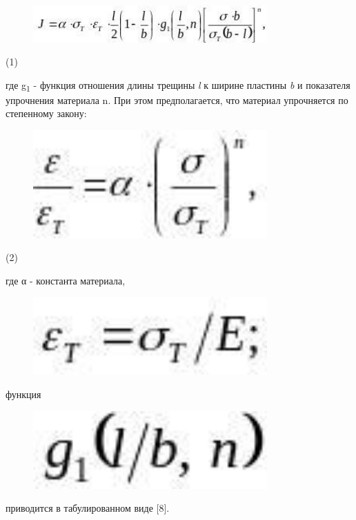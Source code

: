 \begin{figure}[H]
	\centering
	\includegraphics[width=0.8\textwidth]{assets/1153}
	\caption*{}
\end{figure} (1)

где g\textsubscript{1} - функция отношения длины трещины \emph{l} к
ширине пластины \emph{b} и показателя упрочнения материала n. При этом
предполагается, что материал упрочняется по степенному закону:

\begin{figure}[H]
	\centering
	\includegraphics[width=0.8\textwidth]{assets/1154}
	\caption*{}
\end{figure} (2)

где α - константа материала, \begin{figure}[H]
	\centering
	\includegraphics[width=0.8\textwidth]{assets/1155}
	\caption*{}
\end{figure} функция
\begin{figure}[H]
	\centering
	\includegraphics[width=0.8\textwidth]{assets/1156}
	\caption*{}
\end{figure} приводится в табулированном виде
{[}8{]}.

